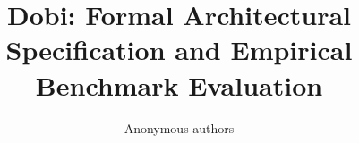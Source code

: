 \title{\textbf{Dobi: Formal Architectural Specification and Empirical Benchmark Evaluation}}

\author{Anonymous authors}
